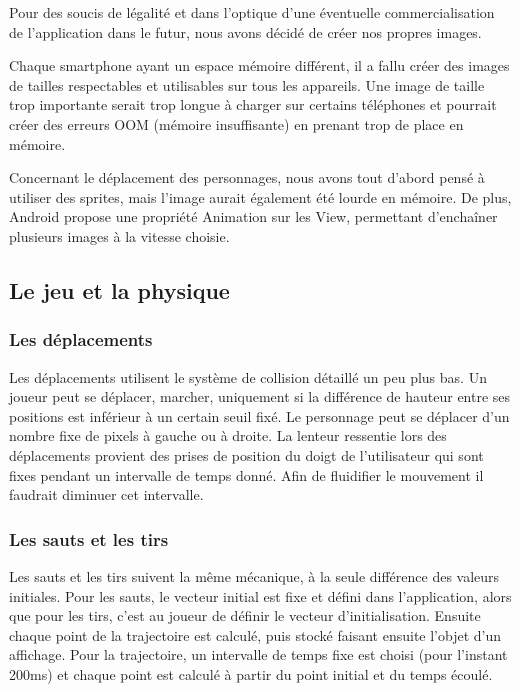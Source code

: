 \documentclass{report}
\begin{document}
Pour des soucis de légalité et dans l’optique d’une éventuelle
commercialisation de l’application dans le futur, nous avons décidé de
créer nos propres images.

Chaque smartphone ayant un espace mémoire différent, il a fallu créer
des images de tailles respectables et utilisables sur tous les
appareils. Une image de taille trop importante serait trop longue à
charger sur certains téléphones et pourrait créer des erreurs OOM
(mémoire insuffisante) en prenant trop de place en mémoire.

Concernant le déplacement des personnages, nous avons tout d’abord pensé
à utiliser des sprites, mais l’image aurait également été lourde en
mémoire. De plus, Android propose une propriété Animation sur les View,
permettant d'enchaîner plusieurs images à la vitesse choisie.

\subsection{Le jeu et la physique}
\bigskip


\subsubsection{Les déplacements}

Les déplacements utilisent le système de collision détaillé un peu plus
bas. Un joueur peut se déplacer, marcher, uniquement si la différence de
hauteur entre ses positions est inférieur à un certain seuil fixé. Le
personnage peut se déplacer d’un nombre fixe de pixels à gauche ou à
droite. La lenteur ressentie lors des déplacements provient des prises
de position du doigt de l’utilisateur qui sont fixes pendant un
intervalle de temps donné. Afin de fluidifier le mouvement il faudrait
diminuer cet intervalle.

\subsubsection{Les sauts et les tirs}
Les sauts et les tirs suivent la même mécanique, à la seule différence
des valeurs initiales. Pour les sauts, le vecteur initial est fixe et
défini dans l’application, alors que pour les tirs, c’est au joueur de 
définir le vecteur d’initialisation. Ensuite chaque point de la 
trajectoire est calculé, puis stocké faisant ensuite l’objet d’un 
affichage. Pour la trajectoire, un intervalle de temps fixe est choisi 
(pour l’instant 200ms) et chaque point est calculé à partir du point 
initial et du temps écoulé.
\end{document}
